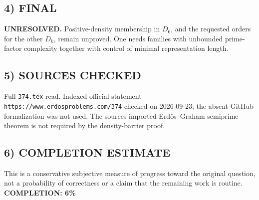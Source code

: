 \subsection{4) FINAL}
\textbf{UNRESOLVED.}
Positive-density membership in $D_6$, and the requested orders for the other $D_k$, remain unproved. One needs families with unbounded prime-factor complexity together with control of minimal representation length.
\subsection{5) SOURCES CHECKED}
Full \texttt{374.tex} read. Indexed official statement \texttt{https://www.erdosproblems.com/374} checked on 2026-09-23; the absent GitHub formalization was not used. The source\textquotesingle s imported Erd\H{o}s--Graham semiprime theorem is not required by the density-barrier proof.
\subsection{6) COMPLETION ESTIMATE}
This is a conservative subjective measure of progress toward the original question, not a probability of correctness or a claim that the remaining work is routine.
\textbf{COMPLETION: 6\%}
